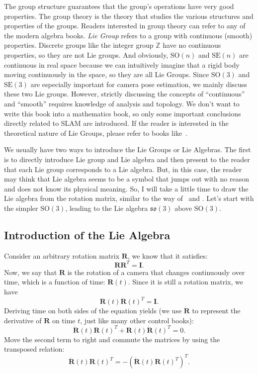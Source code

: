 The group structure guarantees that the group's operations have very good properties. The group theory is the theory that studies the various structures and properties of the groups. Readers interested in group theory can refer to any of the modern algebra books. \textit{Lie Group} refers to a group with continuous (smooth) properties. Discrete groups like the integer group $\mathbb{Z}$ have no continuous properties, so they are not Lie groups. And obviously, $\mathrm{SO}(n)$ and $\mathrm{SE}(n)$ are continuous in real space because we can intuitively imagine that a rigid body moving continuously in the space, so they are all Lie Groups. Since $\mathrm{SO}(3)$ and $\mathrm{SE}(3)$ are especially important for camera pose estimation, we mainly discuss these two Lie groups. However, strictly discussing the concepts of ``continuous'' and ``smooth'' requires knowledge of analysis and topology. We don't want to write this book into a mathematics book, so only some important conclusions directly related to SLAM are introduced. If the reader is interested in the theoretical nature of Lie Groups, please refer to books like~\cite{Varadarajan2013}.

We usually have two ways to introduce the Lie Groups or Lie Algebras. The first is to directly introduce Lie group and Lie algebra and then present to the reader that each Lie group corresponds to a Lie algebra. But, in this case, the reader may think that Lie algebra seems to be a symbol that jumps out with no reason and does not know its physical meaning. So, I will take a little time to draw the Lie algebra from the rotation matrix, similar to the way of~\cite{Ma2012} and \cite{Sola2012}. Let's start with the simpler $\mathrm{SO}(3)$, leading to the Lie algebra $\mathfrak{so}(3)$ above $\mathrm{SO}(3)$.

\subsection{Introduction of the Lie Algebra}
Consider an arbitrary rotation matrix $\mathbf{R}$, we know that it satisfies:
\begin{equation}
\mathbf{R} \mathbf{R}^T=\mathbf{I}.
\end{equation}
Now, we say that $\mathbf{R}$ is the rotation of a camera that changes continuously over time, which is a function of time: $\mathbf{R}(t)$. Since it is still a rotation matrix, we have
\[
\mathbf{R}(t) \mathbf{R}(t) ^T = \mathbf{I}.
\]
Deriving time on both sides of the equation yields (we use $\dot{\mathbf{R}}$ to represent the derivative of $\mathbf{R}$ on time $t$, just like many other control books):
\[
\dot{\mathbf{R}} (t) \mathbf{R} {(t)^T} + \mathbf{R} (t) \dot{\mathbf{R}} {(t) ^T} = 0.
\]
Move the second term to right and commute the matrices by using the transposed relation:
\begin{equation}
\dot{\mathbf{R}} (t) \mathbf{R} {(t)^T} = - \left( \dot{\mathbf{R}} (t) \mathbf{R} {(t)^T} \right)^T .
\end{equation}

